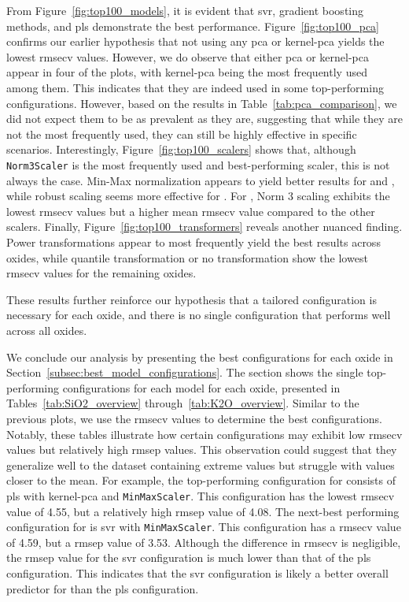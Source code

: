 From Figure~\ref{fig:top100_models}, it is evident that \gls{svr}, gradient boosting methods, and \gls{pls} demonstrate the best performance.
Figure~\ref{fig:top100_pca} confirms our earlier hypothesis that not using any \gls{pca} or \gls{kernel-pca} yields the lowest \gls{rmsecv} values.
However, we do observe that either \gls{pca} or \gls{kernel-pca} appear in four of the plots, with \gls{kernel-pca} being the most frequently used among them.
This indicates that they are indeed used in some top-performing configurations.
However, based on the results in Table~\ref{tab:pca_comparison}, we did not expect them to be as prevalent as they are, suggesting that while they are not the most frequently used, they can still be highly effective in specific scenarios.
Interestingly, Figure~\ref{fig:top100_scalers} shows that, although \texttt{Norm3Scaler} is the most frequently used and best-performing scaler, this is not always the case.
Min-Max normalization appears to yield better results for  and , while robust scaling seems more effective for .
For , Norm 3 scaling exhibits the lowest \gls{rmsecv} values but a higher mean \gls{rmsecv} value compared to the other scalers.
Finally, Figure~\ref{fig:top100_transformers} reveals another nuanced finding.
Power transformations appear to most frequently yield the best results across oxides, while quantile transformation or no transformation show the lowest \gls{rmsecv} values for the remaining oxides.

These results further reinforce our hypothesis that a tailored configuration is necessary for each oxide, and there is no single configuration that performs well across all oxides.



We conclude our analysis by presenting the best configurations for each oxide in Section~\ref{subsec:best_model_configurations}.
The section shows the single top-performing configurations for each model for each oxide, presented in Tables~\ref{tab:SiO2_overview} through~\ref{tab:K2O_overview}.
Similar to the previous plots, we use the \gls{rmsecv} values to determine the best configurations.
Notably, these tables illustrate how certain configurations may exhibit low \gls{rmsecv} values but relatively high \gls{rmsep} values.
This observation could suggest that they generalize well to the dataset containing extreme values but struggle with values closer to the mean.
For example, the top-performing configuration for  consists of \gls{pls} with \gls{kernel-pca} and \texttt{MinMaxScaler}.
This configuration has the lowest \gls{rmsecv} value of 4.55, but a relatively high \gls{rmsep} value of 4.08.
The next-best performing configuration for  is \gls{svr} with \texttt{MinMaxScaler}.
This configuration has a \gls{rmsecv} value of 4.59, but a \gls{rmsep} value of 3.53.
Although the difference in \gls{rmsecv} is negligible, the \gls{rmsep} value for the \gls{svr} configuration is much lower than that of the \gls{pls} configuration.
This indicates that the \gls{svr} configuration is likely a better overall predictor for  than the \gls{pls} configuration.


